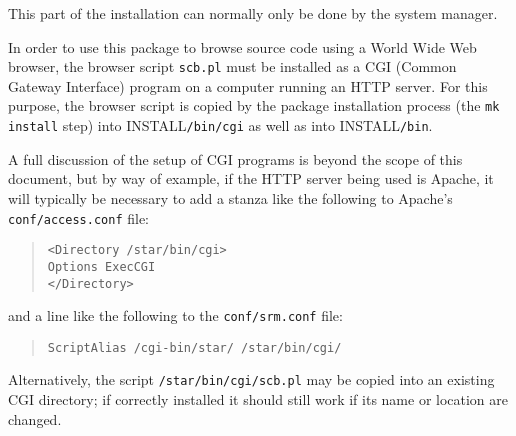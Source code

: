 \documentclass[twoside,11pt]{article}
\newcommand{\htmladdnormallink}[2]{#1}
\renewcommand{\_}{\texttt{\symbol{95}}}
\begin{document}
This part of the installation can normally only be done by 
the system manager.

In order to use this package to browse source code using a
World Wide Web browser, the browser script {\tt scb.pl}
must be installed as a CGI (Common Gateway Interface) program
on a computer running an HTTP server.  
For this purpose, the browser script is copied by the package
installation process (the {\tt mk install} step) 
into INSTALL{\tt /bin/cgi} as well as into INSTALL{\tt /bin}.

A full discussion of the setup of CGI programs is
beyond the scope of this document, but by way of example, 
if the HTTP server being used is 
\htmladdnormallink{Apache}{http://www.apache.org/}, 
it will typically 
be necessary to
add a stanza like the following to Apache's {\tt conf/access.conf} file:
\begin{quote}
\begin{verbatim}
<Directory /star/bin/cgi>
Options ExecCGI
</Directory>
\end{verbatim}
\end{quote}
and a line like the following to the {\tt conf/srm.conf} file:
\begin{quote}
\begin{verbatim}
ScriptAlias /cgi-bin/star/ /star/bin/cgi/
\end{verbatim}
\end{quote}
Alternatively, the script {\tt /star/bin/cgi/scb.pl} may be copied 
into an existing CGI directory;
if correctly installed it should still work if its name or location 
are changed.
\end{document}
